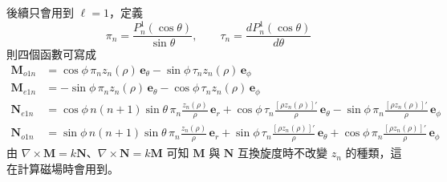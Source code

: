 後續只會用到 $\ell = 1$，定義
\begin{equation}
    \pi_n = \frac{P_n^1\left(\cos\theta\right)}{\sin\theta}, \qquad \tau_n = \frac{dP_n^1\left(\cos\theta\right)}{d\theta}
\end{equation}
則四個函數可寫成
\begin{align}
    \mathbf{M}_{o1n} &= \cos\phi\, \pi_n z_n(\rho)\, \mathbf{e}_{\theta} - \sin\phi\, \tau_n z_n(\rho)\, \mathbf{e}_{\phi} \label{eq:Mo1n}\\
    \mathbf{M}_{e1n} &= -\sin\phi\, \pi_n z_n(\rho)\, \mathbf{e}_{\theta} - \cos\phi\, \tau_n z_n(\rho)\, \mathbf{e}_{\phi} \\
    \mathbf{N}_{e1n} &= \cos\phi\, n(n+1)\sin\theta\, \pi_n \frac{z_n(\rho)}{\rho}\, \mathbf{e}_r + \cos\phi\, \tau_n \frac{\left[\rho z_n(\rho)\right]'}{\rho}\, \mathbf{e}_{\theta} - \sin\phi\, \pi_n \frac{\left[\rho z_n(\rho)\right]'}{\rho}\, \mathbf{e}_{\phi} \label{eq:Ne1n}\\
    \mathbf{N}_{o1n} &= \sin\phi\, n(n+1)\sin\theta\, \pi_n \frac{z_n(\rho)}{\rho}\, \mathbf{e}_r + \sin\phi\, \tau_n \frac{\left[\rho z_n(\rho)\right]'}{\rho}\, \mathbf{e}_{\theta} + \cos\phi\, \pi_n \frac{\left[\rho z_n(\rho)\right]'}{\rho}\, \mathbf{e}_{\phi}
\end{align}
由 $\nabla \times \mathbf{M} = k\mathbf{N}$、$\nabla \times \mathbf{N} = k\mathbf{M}$ 可知 $\mathbf{M}$ 與 $\mathbf{N}$ 互換旋度時不改變 $z_n$ 的種類，這在計算磁場時會用到。


